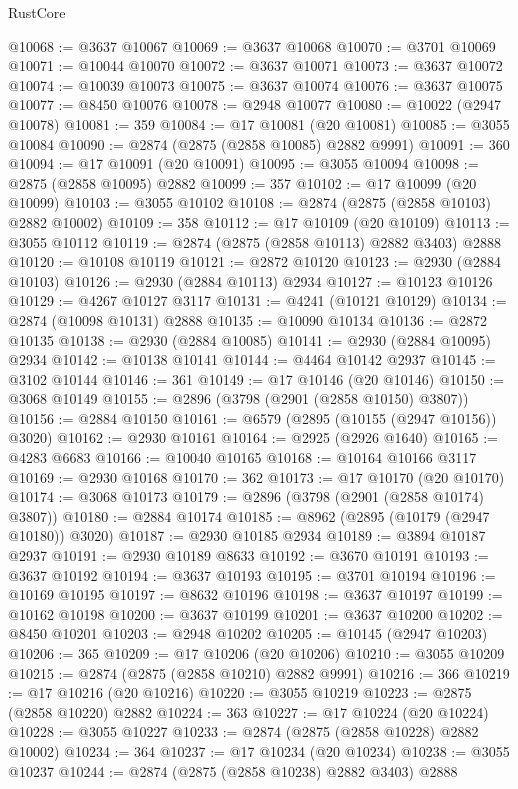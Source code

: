 \begin{lexlean}{RustCore}
\begin{coremodule}
@10068 := @3637 @10067
@10069 := @3637 @10068
@10070 := @3701 @10069
@10071 := @10044 @10070
@10072 := @3637 @10071
@10073 := @3637 @10072
@10074 := @10039 @10073
@10075 := @3637 @10074
@10076 := @3637 @10075
@10077 := @8450 @10076
@10078 := @2948 @10077
@10080 := @10022 (@2947 @10078)
@10081 := 359
@10084 := @17 @10081 (@20 @10081)
@10085 := @3055 @10084
@10090 := @2874 (@2875 (@2858 @10085) @2882 @9991)
@10091 := 360
@10094 := @17 @10091 (@20 @10091)
@10095 := @3055 @10094
@10098 := @2875 (@2858 @10095) @2882
@10099 := 357
@10102 := @17 @10099 (@20 @10099)
@10103 := @3055 @10102
@10108 := @2874 (@2875 (@2858 @10103) @2882 @10002)
@10109 := 358
@10112 := @17 @10109 (@20 @10109)
@10113 := @3055 @10112
@10119 := @2874 (@2875 (@2858 @10113) @2882 @3403) @2888
@10120 := @10108 @10119
@10121 := @2872 @10120
@10123 := @2930 (@2884 @10103)
@10126 := @2930 (@2884 @10113) @2934
@10127 := @10123 @10126
@10129 := @4267 @10127 @3117
@10131 := @4241 (@10121 @10129)
@10134 := @2874 (@10098 @10131) @2888
@10135 := @10090 @10134
@10136 := @2872 @10135
@10138 := @2930 (@2884 @10085)
@10141 := @2930 (@2884 @10095) @2934
@10142 := @10138 @10141
@10144 := @4464 @10142 @2937
@10145 := @3102 @10144
@10146 := 361
@10149 := @17 @10146 (@20 @10146)
@10150 := @3068 @10149
@10155 := @2896 (@3798 (@2901 (@2858 @10150) @3807))
@10156 := @2884 @10150
@10161 := @6579 (@2895 (@10155 (@2947 @10156)) @3020)
@10162 := @2930 @10161
@10164 := @2925 (@2926 @1640)
@10165 := @4283 @6683
@10166 := @10040 @10165
@10168 := @10164 @10166 @3117
@10169 := @2930 @10168
@10170 := 362
@10173 := @17 @10170 (@20 @10170)
@10174 := @3068 @10173
@10179 := @2896 (@3798 (@2901 (@2858 @10174) @3807))
@10180 := @2884 @10174
@10185 := @8962 (@2895 (@10179 (@2947 @10180)) @3020)
@10187 := @2930 @10185 @2934
@10189 := @3894 @10187 @2937
@10191 := @2930 @10189 @8633
@10192 := @3670 @10191
@10193 := @3637 @10192
@10194 := @3637 @10193
@10195 := @3701 @10194
@10196 := @10169 @10195
@10197 := @8632 @10196
@10198 := @3637 @10197
@10199 := @10162 @10198
@10200 := @3637 @10199
@10201 := @3637 @10200
@10202 := @8450 @10201
@10203 := @2948 @10202
@10205 := @10145 (@2947 @10203)
@10206 := 365
@10209 := @17 @10206 (@20 @10206)
@10210 := @3055 @10209
@10215 := @2874 (@2875 (@2858 @10210) @2882 @9991)
@10216 := 366
@10219 := @17 @10216 (@20 @10216)
@10220 := @3055 @10219
@10223 := @2875 (@2858 @10220) @2882
@10224 := 363
@10227 := @17 @10224 (@20 @10224)
@10228 := @3055 @10227
@10233 := @2874 (@2875 (@2858 @10228) @2882 @10002)
@10234 := 364
@10237 := @17 @10234 (@20 @10234)
@10238 := @3055 @10237
@10244 := @2874 (@2875 (@2858 @10238) @2882 @3403) @2888

\end{coremodule}
\end{lexlean}
